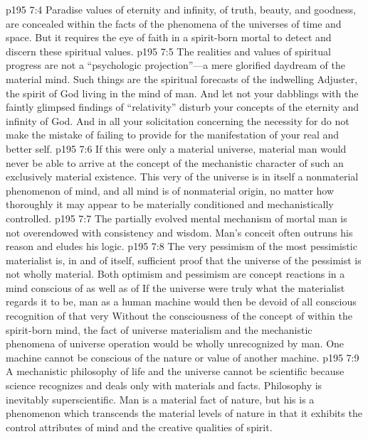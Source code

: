 \vs p195 7:4 Paradise values of eternity and infinity, of truth, beauty, and goodness, are concealed within the facts of the phenomena of the universes of time and space. But it requires the eye of faith in a spirit\hyp{}born mortal to detect and discern these spiritual values.
\vs p195 7:5 The realities and values of spiritual progress are not a “psychologic projection”---a mere glorified daydream of the material mind. Such things are the spiritual forecasts of the indwelling Adjuster, the spirit of God living in the mind of man. And let not your dabblings with the faintly glimpsed findings of “relativity” disturb your concepts of the eternity and infinity of God. And in all your solicitation concerning the necessity for  do not make the mistake of failing to provide for  the manifestation of your real and better self.
\vs p195 7:6 If this were only a material universe, material man would never be able to arrive at the concept of the mechanistic character of such an exclusively material existence. This very  of the universe is in itself a nonmaterial phenomenon of mind, and all mind is of nonmaterial origin, no matter how thoroughly it may appear to be materially conditioned and mechanistically controlled.
\vs p195 7:7 The partially evolved mental mechanism of mortal man is not overendowed with consistency and wisdom. Man’s conceit often outruns his reason and eludes his logic.
\vs p195 7:8 The very pessimism of the most pessimistic materialist is, in and of itself, sufficient proof that the universe of the pessimist is not wholly material. Both optimism and pessimism are concept reactions in a mind conscious of  as well as of  If the universe were truly what the materialist regards it to be, man as a human machine would then be devoid of all conscious recognition of that very  Without the consciousness of the concept of  within the spirit\hyp{}born mind, the fact of universe materialism and the mechanistic phenomena of universe operation would be wholly unrecognized by man. One machine cannot be conscious of the nature or value of another machine.
\vs p195 7:9 A mechanistic philosophy of life and the universe cannot be scientific because science recognizes and deals only with materials and facts. Philosophy is inevitably superscientific. Man is a material fact of nature, but his  is a phenomenon which transcends the material levels of nature in that it exhibits the control attributes of mind and the creative qualities of spirit.
